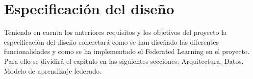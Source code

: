 \section{Especificación del diseño}
Teniendo en cuenta los anteriores requisitos y los objetivos del proyecto la especificación del diseño concretará como se han diseñado las diferentes funcionalidades y como se ha implementado el Federated Learning en el proyecto. Para ello se dividirá el capitulo en las siguientes secciones: Arquitectura, Datos, Modelo de aprendizaje federado.

% 


% 


% 


% 



